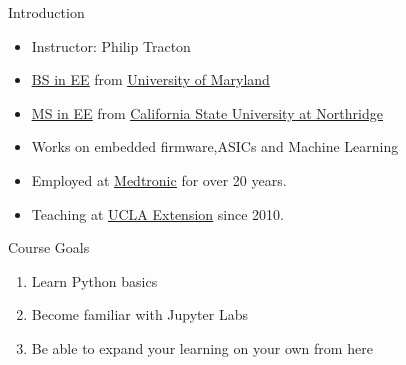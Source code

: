 %
%
%
\begin{Slide}{Introduction}
\begin{itemize} 
  \item Instructor: Philip Tracton
  \item \underline{\href{http://www.ece.umd.edu/}{BS in EE}} from \underline{\href{http://www.umd.edu}{University of Maryland}}
  \item \underline{\href{http://www.ecs.csun.edu/ece/index.html}{MS in EE}} from \underline{\href{http://www.csun.edu}{California State University at Northridge}}
  \item Works on embedded firmware,ASICs and Machine Learning
  \item Employed at  \underline{\href{http://www.medtronic.com}{Medtronic}} for over 20 years.
  \item Teaching at \underline{\href{https://www.uclaextension.edu/}{UCLA Extension}} since 2010.
\end{itemize} 
\end{Slide}

%
%
%
\begin{Slide}{Course Goals}
  \begin{enumerate}
  \item Learn Python basics
  \item Become familiar with Jupyter Labs
  \item Be able to expand your learning on your own from here
  \end{enumerate}
\end{Slide} 

